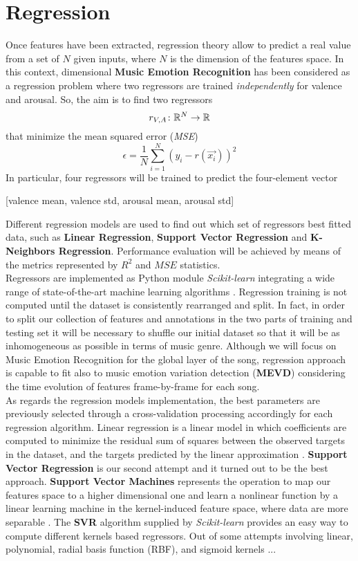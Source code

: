\section{Regression} %
Once features have been extracted, regression theory allow to predict a real value from a set of $N$ given inputs, where $N$ is the dimension of the features space. In this context, dimensional \textbf{Music Emotion Recognition} has been considered as a regression problem where two regressors are trained \textit{independently} for valence and arousal. So, the aim is to find two regressors  
\[r_{V, A} \colon \mathbb{R}^{N} \to \mathbb{R}\]
that minimize the mean squared error (\textit{MSE})
\[ \epsilon = \frac{1}{N} \sum_{i =1}^{N} (y_i - r(\vec{x_i}))^2\]
In particular, four regressors will be trained to predict the four-element vector
\begin{center}
[valence mean, valence std, arousal mean, arousal std]
\end{center}
Different regression models are used to find out which set of regressors best fitted data, such as \textbf{Linear Regression}, \textbf{Support Vector Regression} and \textbf{K-Neighbors Regression}. Performance evaluation will be achieved by means of the metrics represented by $R^2$ and $MSE$ statistics. \\
Regressors are implemented as Python module \textit{Scikit-learn} integrating a wide range of state-of-the-art machine learning algorithms \cite{scikit-learn}. Regression training is not computed until the dataset is consistently rearranged and split. In fact, in order to split our collection of features and annotations in the two parts of training and testing set it will be necessary to shuffle our initial dataset so that it will be as inhomogeneous as possible in terms of music genre. Although we will focus on Music Emotion Recognition for the global layer of the song, regression approach is capable to fit also to music emotion variation detection (\textbf{MEVD}) considering the time evolution of features frame-by-frame for each song.\\
As regards the regression models implementation, the best parameters are previously selected through a cross-validation processing accordingly for each regression algorithm. Linear regression is a linear model in which coefficients are computed to minimize the residual sum of squares between the observed targets in the dataset, and the targets predicted by the linear approximation \cite{scikit-learn}. \textbf{Support Vector Regression} is our second attempt and it turned out to be the best approach. \textbf{Support Vector Machines} represents the operation to map our features space to a higher dimensional one and learn a nonlinear function by a linear learning machine in the kernel-induced feature space, where data are more separable \cite{yang2008regression}. The \textbf{SVR} algorithm supplied by \textit{Scikit-learn} provides an easy way to compute different kernels based regressors. Out of some attempts involving linear, polynomial, radial basis function (RBF), and sigmoid kernels ...